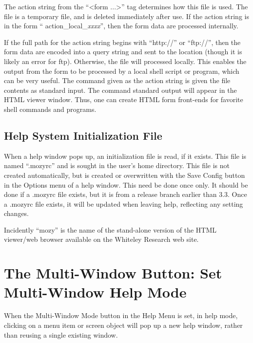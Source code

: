 The action string from the ``{\vt <form ...>}'' tag determines how
this file is used.  The file is a temporary file, and is deleted
immediately after use.  If the action string is in the form ``{\vt
action\_local\_}{\it xxxx\/}'', then the form data are processed
internally.

If the full path for the action string begins with ``{\vt http://}''
or ``{\vt ftp://}'', then the form data are encoded into a query
string and sent to the location (though it is likely an error for
ftp).  Otherwise, the file will processed locally.  This enables the
output from the form to be processed by a local shell script or
program, which can be very useful.  The command given as the action
string is given the file contents as standard input.  The command
standard output will appear in the HTML viewer window.  Thus, one can
create HTML form front-ends for favorite shell commands and programs.

\subsection{Help System Initialization File}
\label{mozyrcfile}

When a help window pops up, an initialization file is read, if it
exists.  This file is named ``{\vt .mozyrc}'' and is sought in the
user's home directory.  This file is not created automatically, but is
created or overwritten with the {\cb Save Config} button in the {\cb
Options} menu of a help window.  This need be done once only.  It
should be done if a {\vt .mozyrc} file exists, but it is from a
release branch earlier than 3.3.  Once a {\vt .mozyrc} file exists,
it will be updated when leaving help, reflecting any setting changes.

Incidently ``mozy'' is the name of the stand-alone version of the HTML
viewer/web browser available on the Whiteley Research web site.


\section{The {\cb Multi-Window} Button: Set Multi-Window Help Mode}
When the {\cb Multi-Window Mode} button in the {\cb Help Menu} is set,
in help mode, clicking on a menu item or screen object will pop up a
new help window, rather than reusing a single existing window.

